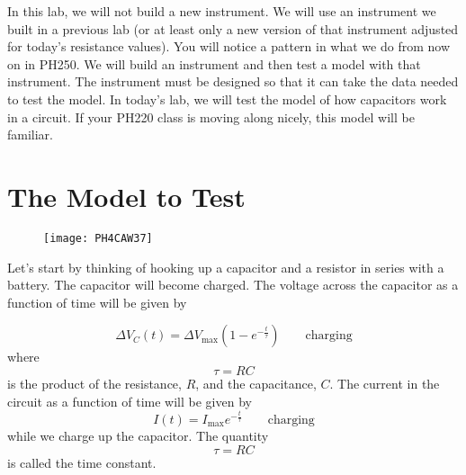 In this lab, we will not build a new instrument. We will use an instrument
we built in a previous lab (or at least only a new version of that
instrument adjusted for today's resistance values). You will notice a
pattern in what we do from now on in PH250. We will build an instrument and
then test a model with that instrument. The instrument must be designed so
that it can take the data needed to test the model. In today's lab, we will
test the model of how capacitors work in a circuit. If your PH220 class is
moving along nicely, this model will be familiar.

\section{The Model to Test}

\begin{figure}[h!]
\texttt{[image: PH4CAW37]}
\end{figure}

Let's start by thinking of hooking up a capacitor and a resistor in series
with a battery. The capacitor will become charged. The voltage across the
capacitor as a function of time will be given by

\begin{equation*}
\Delta V_{C}\left( t\right) =\Delta V_{\max }\left( 1-e^{-\frac{t}{\tau }%
}\right) \qquad \text{charging}
\end{equation*}%
where 
\begin{equation}
\tau =RC
\end{equation}%
is the product of the resistance, $R$, and the capacitance, $C.$ The current
in the circuit as a function of time will be given by%
\begin{equation*}
I\left( t\right) =I_{\max }e^{-\frac{t}{\tau }}\qquad \text{charging}
\end{equation*}%
while we charge up the capacitor. The quantity 
\begin{equation*}
\tau =RC
\end{equation*}%
is called the time constant.

